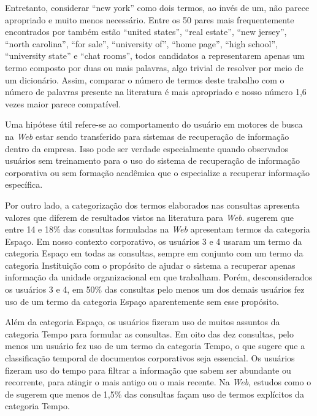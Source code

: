 Entretanto, considerar ``new york'' como dois termos, ao invés de um, não parece apropriado e muito menos necessário. Entre os 50 pares mais frequentemente encontrados por  também estão “united states”, ``real estate'', ``new jersey'', ``north carolina'', ``for sale'', ``university of'', ``home page'', ``high school'', ``university state'' e ``chat rooms'', todos candidatos a representarem apenas um termo composto por duas ou mais palavras, algo trivial de resolver por meio de um dicionário. Assim, comparar o número de termos deste trabalho com o número de palavras presente na literatura é mais apropriado e nosso número 1,6 vezes maior parece compatível.

Uma hipótese útil refere-se ao comportamento do usuário em motores de busca na \textit{Web} estar sendo transferido para sistemas de recuperação de informação dentro da empresa. Isso pode ser verdade especialmente quando observados usuários sem treinamento para o uso do sistema de recuperação de informação corporativa ou sem formação acadêmica que o especialize a recuperar informação específica.

Por outro lado, a categorização dos termos elaborados nas consultas apresenta valores que diferem de resultados vistos na literatura para \textit{Web}.  sugerem que entre 14 e 18\% das consultas formuladas na \textit{Web} apresentam termos da categoria Espaço. Em nosso contexto corporativo, os usuários 3 e 4 usaram um termo da categoria Espaço em todas as consultas, sempre em conjunto com um termo da categoria Instituição com o propósito de ajudar o sistema a recuperar apenas informação da unidade organizacional em que trabalham. Porém, desconsiderados os usuários 3 e 4, em 50\% das consultas pelo menos um dos demais usuários fez uso de um termo da categoria Espaço aparentemente sem esse propósito.

Além da categoria Espaço, os usuários fizeram uso de muitos assuntos da categoria Tempo para formular as consultas. Em oito das dez consultas, pelo menos um usuário fez uso de um termo da categoria Tempo, o que sugere que a classificação temporal de documentos corporativos seja essencial. Os usuários fizeram uso do tempo para filtrar a informação que sabem ser abundante ou recorrente, para atingir o mais antigo ou o mais recente. Na \textit{Web}, estudos como o de  sugerem que menos de 1,5\% das consultas façam uso de termos explícitos da categoria Tempo.


